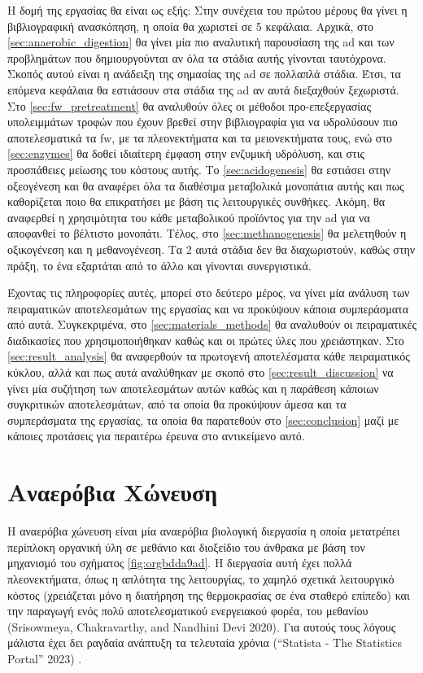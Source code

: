 \documentclass[11pt]{report}
\makeatletter
\newcommand{\citeprocitem}[2]{\hyper@linkstart{cite}{citeproc_bib_item_#1}#2\hyper@linkend}
\makeatother
\begin{document}
Η δομή της εργασίας θα είναι ως εξής: Στην συνέχεια του πρώτου μέρους θα γίνει η βιβλιογραφική ανασκόπηση, η οποία θα χωριστεί σε 5 κεφάλαια. Αρχικά, στο \autoref{sec:anaerobic_digestion} θα γίνει μία πιο αναλυτική παρουσίαση της \acrshort{ad} και των προβλημάτων που δημιουργούνται αν όλα τα στάδια αυτής γίνονται ταυτόχρονα. Σκοπός αυτού είναι η ανάδειξη της σημασίας της \acrshort{ad} σε πολλαπλά στάδια. Έτσι, τα επόμενα κεφάλαια θα εστιάσουν στα στάδια της \acrshort{ad} αν αυτά διεξαχθούν ξεχωριστά. Στο \autoref{sec:fw_pretreatment} θα αναλυθούν όλες οι μέθοδοι προ-επεξεργασίας υπολειμμάτων τροφών που έχουν βρεθεί στην βιβλιογραφία για να υδρολύσουν πιο αποτελεσματικά τα \acrshort{fw}, με τα πλεονεκτήματα και τα μειονεκτήματα τους, ενώ στο \autoref{sec:enzymes} θα δοθεί ιδιαίτερη έμφαση στην ενζυμική υδρόλυση, και στις προσπάθειες μείωσης του κόστους αυτής. Το \autoref{sec:acidogenesis} θα εστιάσει στην οξεογένεση και θα αναφέρει όλα τα διαθέσιμα μεταβολικά μονοπάτια αυτής και πως καθορίζεται ποιο θα επικρατήσει με βάση τις λειτουργικές συνθήκες. Ακόμη, θα αναφερθεί η χρησιμότητα του κάθε μεταβολικού προϊόντος για την \acrshort{ad} για να αποφανθεί το βέλτιστο μονοπάτι. Τέλος, στο \autoref{sec:methanogenesis} θα μελετηθούν η οξικογένεση και η μεθανογένεση. Τα 2 αυτά στάδια δεν θα διαχωριστούν, καθώς στην πράξη, το ένα εξαρτάται από το άλλο και γίνονται συνεργιστικά.

Έχοντας τις πληροφορίες αυτές, μπορεί στο δεύτερο μέρος, να γίνει μία ανάλυση των πειραματικών αποτελεσμάτων της εργασίας και να προκύψουν κάποια συμπεράσματα από αυτά. Συγκεκριμένα, στο \autoref{sec:materials_methods} θα αναλυθούν οι πειραματικές διαδικασίες που χρησιμοποιήθηκαν καθώς και οι πρώτες ύλες που χρειάστηκαν. Στο \autoref{sec:result_analysis} θα αναφερθούν τα πρωτογενή αποτελέσματα κάθε πειραματικός κύκλου, αλλά και πως αυτά αναλύθηκαν με σκοπό στο \autoref{sec:result_discussion} να γίνει μία συζήτηση των αποτελεσμάτων αυτών καθώς και η παράθεση κάποιων συγκριτικών αποτελεσμάτων, από τα οποία θα προκύψουν άμεσα και τα συμπεράσματα της εργασίας, τα οποία θα παρατεθούν στο \autoref{sec:conclusion} μαζί με κάποιες προτάσεις για περαιτέρω έρευνα στο αντικείμενο αυτό.

\chapter{Αναερόβια Χώνευση}
\label{sec:org5edd30d}
\label{sec:anaerobic_digestion}

Η αναερόβια χώνευση είναι μία αναερόβια βιολογική διεργασία η οποία μετατρέπει περίπλοκη οργανική ύλη σε μεθάνιο και διοξείδιο του άνθρακα με βάση τον μηχανισμό του σχήματος \ref{fig:orgbdda9ad}. Η διεργασία αυτή έχει πολλά πλεονεκτήματα, όπως η απλότητα της λειτουργίας, το χαμηλό σχετικά λειτουργικό κόστος (χρειάζεται μόνο η διατήρηση της θερμοκρασίας σε ένα σταθερό επίπεδο) και την παραγωγή ενός πολύ αποτελεσματικού ενεργειακού φορέα, του μεθανίου (\citeprocitem{71}{Srisowmeya, Chakravarthy, and Nandhini Devi 2020}). Για αυτούς τους λόγους μάλιστα έχει δει ραγδαία ανάπτυξη τα τελευταία χρόνια (\citeprocitem{72}{“Statista - The Statistics Portal” 2023}) .
\end{document}
